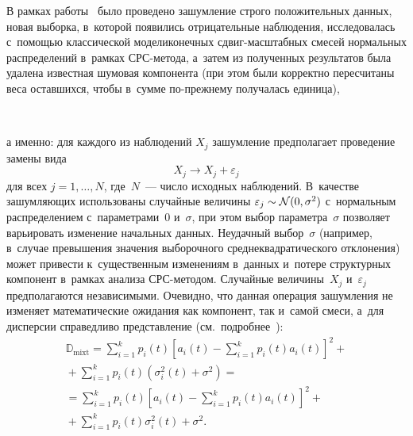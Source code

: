 \begin{multicols}{2}
В рамках работы~\cite{Gorshenin2016CCIS2} было проведено за\-шум\-ление 
строго положительных данных, новая выбор\-ка, в~которой появились отрицательные 
на\-блю\-дения, исследовалась с~помощью классической \mbox{модели}\linebreak конечных сдвиг-мас\-штаб\-ных 
смесей нормальных распределений в~рамках СРС-ме\-то\-да, а~затем из полученных 
результатов была удалена известная шумовая компонента (при этом были корректно 
пересчитаны веса оставшихся, чтобы в~сумме по-преж\-не\-му получалась единица),
\begin{figure*}[b] %
 \vspace*{12pt}
\begin{center}
\mbox{%
\epsfxsize=160mm
}
\end{center}
\vspace*{-9pt}
\label{FigLikelihood}
\end{figure*}
а именно: для каж\-дого из наблюдений $X_j$ зашумление предполагает проведение 
замены вида
\begin{equation*}
X_j \to X_j +\varepsilon_j
\end{equation*}
для всех $j=1,\ldots,N$, где~$N$~--- чис\-ло исходных наблюдений. 
В~качестве зашумляющих использованы случайные величины 
$\varepsilon_j\hm\sim\mathcal{N}(0,\sigma^2)$ с~нормальным распределением 
с~параметрами~$0$ и~$\sigma$, при этом выбор параметра~$\sigma$ 
позволяет варьировать изменение начальных данных. Неудачный выбор~$\sigma$ 
(например, в~случае превышения значения выборочного среднеквадратического отклонения) 
может при\-вес\-ти к~существенным изменениям в~данных и~потере структурных компонент 
в~рамках анализа СРС-ме\-то\-дом. Случайные величины~$X_j$ и~$\varepsilon_j$ 
предполагаются независимыми. Очевидно, что данная операция зашумления 
не изменяет математические ожидания как компонент, так и~самой смеси, 
а~для дисперсии справедливо представление 
(см.\ подробнее~\cite{Korolev2011,Gorshenin2016CCIS2}):
\begin{multline*}
\mathbb{D}_{\mathrm{mixt}}=
\sum\limits_{i=1}^{k}p_i(t)\left[a_i(t)-\sum\limits_{i=1}^{k}p_i(t)a_i(t)\right]^2+{}\\[2pt]
{}+
\sum\limits_{i=1}^{k}p_i(t)(\sigma_i^2(t)+\sigma^2)={}\\[2pt]
{}=\sum\limits_{i=1}^{k}p_i(t)\left[
a_i(t)-\sum\limits_{i=1}^{k}p_i(t)a_i(t)\right]^2+{}\\[2pt]
{}+\sum\limits_{i=1}^{k}p_i(t)
\sigma_i^2(t) +\sigma^2.
\end{multline*}


\end{multicols}
